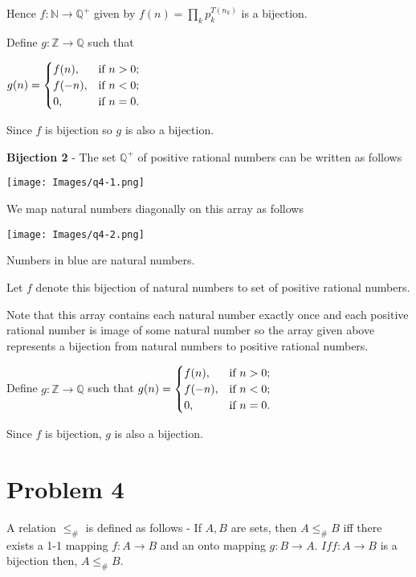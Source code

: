 \documentclass{article}
\begin{document}
    \qquad Hence $f: \mathbb{N}\rightarrow \mathbb{Q^+}$ given by $f(n)=\prod_{k}p_k^{T(n_k)}$ is a bijection.
    
    
    \qquad Define $g: \mathbb{Z} \rightarrow \mathbb{Q}$ such that
    
    \qquad $g(n)=
    \begin{cases}
        f(n), & \hbox{if $n>0$;} \\
        f(-n), & \hbox{if $n<0$;} \\
        0, & \hbox{if $n=0$.}
    \end{cases}$
    
    \qquad Since $f$ is bijection so $g$ is also a bijection. 
                
    \quad \textbf{Bijection 2} - The set $\mathbb{Q^+}$ of positive rational numbers can be written as follows

    \begin{center}
    \texttt{[image: Images/q4-1.png]}
    \end{center}
    
    \quad We map natural numbers diagonally on this array as follows
    
    \begin{center}
    \texttt{[image: Images/q4-2.png]}
    \end{center}
    
    \quad Numbers in blue are natural numbers. 
    
    \quad Let $f$ denote this bijection of natural numbers to set of positive rational numbers.
    
    \quad Note that this array contains each natural number exactly once and each positive rational number is image of some natural number so the array given above represents a bijection from natural numbers to positive rational numbers. 
    
    \quad Define $g: \mathbb{Z}\rightarrow \mathbb{Q}$ such that $g(n)= \begin{cases}
        f(n), & \hbox{if $n>0$;} \\
        f(-n), & \hbox{if $n<0$;} \\
        0, & \hbox{if $n=0$.}
    \end{cases}$

    \quad Since $f$ is bijection, $g$ is also a bijection.

    \section*{Problem 4}  A relation $ \leq_{\#}$ is defined as follows - If $A, B$ are sets, then $A \leq_{\#} B$ iff there exists a 1-1 mapping $f : A \rightarrow B$ and an onto mapping $g : B \rightarrow A$. $If f : A \rightarrow B$ is a bijection then, $A\leq_{\#} B$.
    
\end{document}
